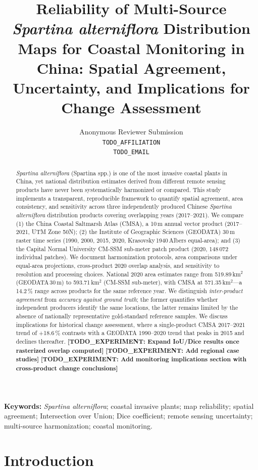 \documentclass[11pt]{article}
\title{Reliability of Multi-Source \textit{Spartina alterniflora} Distribution Maps
for Coastal Monitoring in China: Spatial Agreement, Uncertainty, and Implications
for Change Assessment}
\author{Anonymous Reviewer Submission \\
\texttt{TODO_AFFILIATION \\ TODO_EMAIL}}
\date{}
\newcommand{\TODOEXP}[1]{\textcolor{todocolor}{\textbf{[TODO_EXPERIMENT: #1]}}}
\begin{document}
\maketitle

\begin{abstract}
\textit{Spartina alterniflora} (Spartina spp.) is one of the most invasive coastal
plants in China, yet national distribution estimates derived from different remote
sensing products have never been systematically harmonized or compared.
This study implements a transparent, reproducible framework to quantify spatial
agreement, area consistency, and sensitivity across three independently produced
Chinese \textit{Spartina alterniflora} distribution products covering overlapping
years (2017--2021). We compare (1) the China Coastal Saltmarsh Atlas (CMSA), a
10\,m annual vector product (2017--2021, UTM Zone 50N); (2) the Institute of
Geographic Sciences (GEODATA) 30\,m raster time series (1990, 2000, 2015, 2020,
Krasovsky\,1940\,Albers equal-area); and (3) the Capital Normal University
CM-SSM sub-meter patch product (2020, 148\,072 individual patches).
We document harmonization protocols, area comparisons under equal-area projections,
cross-product 2020 overlap analysis, and sensitivity to resolution and processing
choices. National 2020 area estimates range from 519.89\,km$^2$ (GEODATA\,30\,m)
to 593.71\,km$^2$ (CM-SSM sub-meter), with CMSA at 571.35\,km$^2$---a
14.2\,\% range across products for the same reference year.
We distinguish \textit{inter-product agreement} from \textit{accuracy against
ground truth}; the former quantifies whether independent producers identify
the same locations, the latter remains limited by the absence of nationally
representative gold-standard reference samples. We discuss implications for
historical change assessment, where a single-product CMSA 2017--2021 trend of
+18.6\,\% contrasts with a GEODATA 1990--2020 trend that peaks in 2015 and
declines thereafter.
\TODOEXP{Expand IoU/Dice results once rasterized overlap computed}
\TODOEXP{Add regional case studies}
\TODOEXP{Add monitoring implications section with cross-product change conclusions}
\end{abstract}

\textbf{Keywords:} \textit{Spartina alterniflora}; coastal invasive plants;
map reliability; spatial agreement; Intersection over Union; Dice coefficient;
remote sensing uncertainty; multi-source harmonization; coastal monitoring.

\section{Introduction}
\end{document}
